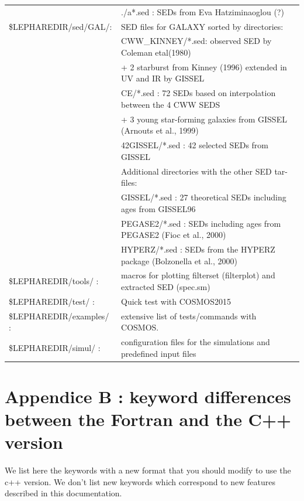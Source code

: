 \documentclass[12pt]{article}
\begin{document}
\begin{tabular}{ll}
		&	       ./a*.sed   : SEDs from Eva Hatziminaoglou (?) \\ 
%
\$LEPHAREDIR/sed/GAL/:& SED files for GALAXY  sorted by directories: \\
		&		CWW\_KINNEY/*.sed: observed SED by Coleman etal(1980)\\
                &          + 2 starburst from Kinney (1996) extended in UV and IR by GISSEL \\
		&		CE/*.sed        : 72 SEDs based on interpolation between the 4 CWW SEDS \\
		&	+ 3 young star-forming galaxies from GISSEL (Arnouts et al., 1999)\\
		&	       	42GISSEL/*.sed  : 42 selected SEDs from GISSEL \\
		&		Additional directories with the other SED tar-files:\\
		&		GISSEL/*.sed    : 27 theoretical SEDs including ages from GISSEL96\\
		&		PEGASE2/*.sed   : SEDs including ages from PEGASE2 (Fioc et al., 2000)\\
		&		HYPERZ/*.sed    : SEDs from the HYPERZ package (Bolzonella et al., 2000) \\
%
\$LEPHAREDIR/tools/  :&  macros for plotting filterset (filterplot)  and extracted SED (spec.sm)\\
%
\$LEPHAREDIR/test/   :& Quick test with COSMOS2015 \\
\$LEPHAREDIR/examples/   :& extensive list of tests/commands with COSMOS.\\
%
\$LEPHAREDIR/simul/  :& configuration files for the simulations and  predefined  input files\\
%
\end{tabular}

\section{Appendice B : keyword differences between the Fortran and the C++ version}

We list here the keywords with a new format that you should modify to use the c++ version. We don't list new keywords which correspond to new features described in this documentation.\\
\end{document}

